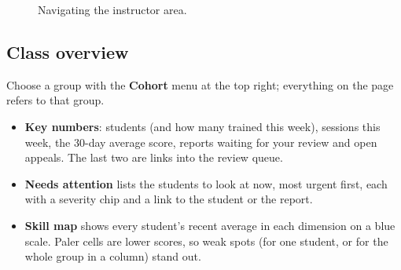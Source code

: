\documentclass[11pt,a4paper]{article}
\newcommand{\ui}[1]{\textbf{\color{brand}\nohyphens{#1}}} %
\begin{document}
\begin{figure}[H]
\centering
{}
\caption{Navigating the instructor area.}
\end{figure}

\subsection{Class overview}
Choose a group with the \ui{Cohort} menu at the top right; everything on the page refers to that
group.

\begin{itemize}
  \item \textbf{Key numbers}: students (and how many trained this week), sessions this week, the
        30-day average score, reports waiting for your review and open appeals. The last two are
        links into the review queue.
  \item \textbf{Needs attention} lists the students to look at now, most urgent first, each with a
        severity chip and a link to the student or the report.
  \item \textbf{Skill map} shows every student's recent average in each dimension on a blue scale.
        Paler cells are lower scores, so weak spots (for one student, or for the whole group in a
        column) stand out.
\end{itemize}
\end{document}
